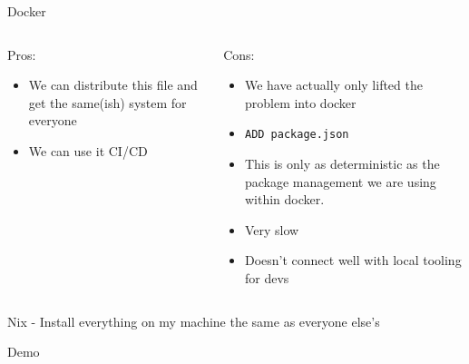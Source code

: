 \documentclass[smaller,aspectratio=169]{beamer}
\begin{document}
\begin{frame}[label={sec:org6152165},fragile]{Docker}
 \begin{columns}
\begin{column}[t]{0.45\columnwidth}
Pros:
\begin{itemize}
\item We can distribute this file and get the same(ish) system for everyone
\item We can use it CI/CD
\end{itemize}
\end{column}
\begin{column}[t]{0.45\columnwidth}
Cons:
\begin{itemize}
\item We have actually only lifted the problem into docker
\item \texttt{ADD package.json}
\item This is only as deterministic as the package management we are using within docker.
\item Very slow
\item Doesn't connect well with local tooling for devs
\end{itemize}
\end{column}
\end{columns}
\end{frame}
\begin{frame}[label={sec:org48324c1}]{Nix - Install everything on my machine the same as everyone else's}
\end{frame}
\begin{frame}[label={sec:org85fe781}]{Demo}
\end{frame}
\end{document}
